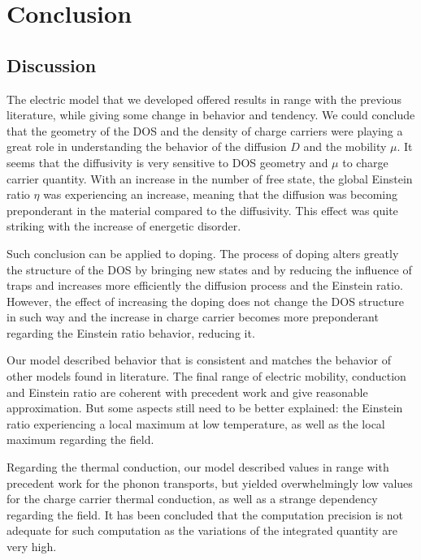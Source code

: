 
\chapter{Conclusion}

\section{Discussion}

The electric model that we developed offered results in range with the previous literature, while giving some change in behavior and tendency. We could conclude that the geometry of the DOS and the density of charge carriers were playing a great role in understanding the behavior of the diffusion $D$ and the mobility $\mu$. It seems that the diffusivity is very sensitive to DOS geometry and $\mu$ to charge carrier quantity. With an increase in the number of free state, the global Einstein ratio $\eta$ was experiencing an increase, meaning that the diffusion was becoming preponderant in the material compared to the diffusivity. This effect was quite striking with the increase of energetic disorder.

Such conclusion can be applied to doping. The process of doping alters greatly the structure of the DOS by bringing new states and by reducing the influence of traps and increases more efficiently the diffusion process and the Einstein ratio. However, the effect of increasing the doping does not change the DOS structure in such way and the increase in charge carrier becomes more preponderant regarding the Einstein ratio behavior, reducing it.

Our model described behavior that is consistent and matches the behavior of other models found in literature. The final range of electric mobility, conduction and Einstein ratio are coherent with precedent work and give reasonable approximation. But some aspects still need to be better explained: the Einstein ratio experiencing a local maximum at low temperature, as well as the local maximum regarding the field.

Regarding the thermal conduction, our model described values in range with precedent work for the phonon transports, but yielded overwhelmingly low values for the charge carrier thermal conduction, as well as a strange dependency regarding the field. It has been concluded that the computation precision is not adequate for such computation as the variations of the integrated quantity are very high.

